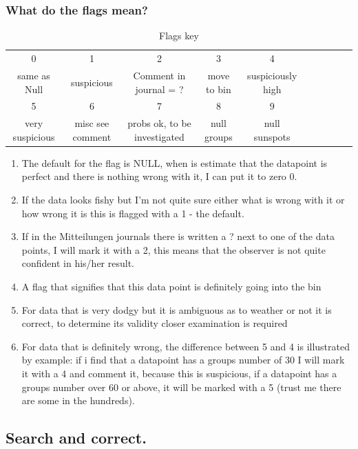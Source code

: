 \documentclass[12pt]{article}
\begin{document}
\subsubsection{What do the flags mean?}\label{flags section}
\newpage%
\begin{table}[h!]
    \centering
    \begin{tabular}{c|c|c|c|c|c|c|c|c|c}
        0 & 1 & 2 & 3 & 4 \\
        same as Null & suspicious & Comment in journal = ? & move to bin & suspiciously high\\
        \hline
        5 & 6 & 7 & 8 & 9\\
        very suspicious & misc see comment & probs ok, to be investigated & null groups & null sunspots
         
    \end{tabular}
    \caption{Flags key}
    \label{tab:flag}
\end{table}
\begin{enumerate}[start=0]
    \item The default for the flag is NULL, when is estimate that the datapoint is perfect and there is nothing wrong with it, I can put it to zero 0.
    \item If the data looks fishy but I'm not quite sure either what is wrong with it or how wrong it is this is flagged with a 1 - the default.
    \item If in the Mitteilungen journals there is written a ? next to one of the data points, I will mark it with a 2, this means that the observer is not quite confident in his/her result.
    \item A flag that signifies that this data point is definitely going into the bin
    \item For data that is very dodgy but it is ambiguous as to weather or not it is correct, to determine its validity closer examination is required
    \item For data that is definitely wrong, the difference between 5 and 4 is illustrated by example: if i find that a datapoint has a groups number of 30 I will mark it with a 4 and comment it, because this is suspicious, if a datapoint has a groups number over 60 or above, it will be marked with a 5 (trust me there are some in the hundreds).
\end{enumerate}
  


\subsection{Search and correct.}
\end{document}
